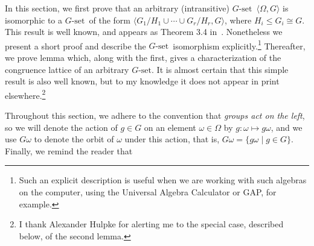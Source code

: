 \documentclass[cm,dissertation]{uhthesis}
\theoremstyle{plain}
\theoremstyle{definition}
\theoremstyle{remark}
\numberwithin{theorem}{section}
\numberwithin{claim}{chapter}
\numberwithin{equation}{section}
\numberwithin{conjecture}{chapter}
\newcommand{\<}{\ensuremath{\langle}}
\renewcommand{\>}{\ensuremath{\rangle}}
\renewcommand{\leq}{\ensuremath{\leqslant}}
\newcommand{\GAP}{\textsf{GAP}}
\newcommand{\0}{\ensuremath{\mathbf{0}}}
\newcommand{\1}{\ensuremath{\mathbf{1}}}
\newcommand{\2}{\ensuremath{\mathbf{2}}}
\newcommand{\3}{\ensuremath{\mathbf{3}}}
\newcommand{\4}{\ensuremath{\mathbf{4}}}
\newcommand{\5}{\ensuremath{\mathbf{5}}}
\newcommand{\Gset}{\ensuremath{G\text{-set}}}
\begin{document}
In this section, we first prove 
that an arbitrary (intransitive)
\Gset\ $\<\Omega, G\>$ is isomorphic to a \Gset\ of the form
$\<G_1/H_1 \cup \cdots \cup G_r/H_r, G\>$, where
$H_i \leq G_i\cong G$. 
This result is well known, and appears as
Theorem 3.4 in~\cite{alvi:1987}.  Nonetheless we present a short proof and
describe the \Gset\ isomorphism explicitly.\footnote{Such an explicit
  description is useful when we are working with such algebras on the computer,
  using the Universal Algebra Calculator or \GAP, for example.}
Thereafter, we prove lemma which, along
with the first, gives a characterization of the congruence lattice of an
arbitrary \Gset.   
It is almost certain that this simple result is also well known,
but to my knowledge it does not appear in print elsewhere.\footnote{I thank Alexander
Hulpke for alerting me to the special case, described below, of the second lemma.}

Throughout this section, we adhere to the convention that \emph{groups act on the
  left}, so we will denote the action of $g\in G$ on an element 
$\omega\in \Omega$ 
by $g: \omega \mapsto g \omega$, and we use $G\omega$ to denote the orbit of
$\omega$ under this action, that is, $G\omega  = \{g\omega  \mid g\in G\}$.
Finally, we remind the reader that
\end{document}
